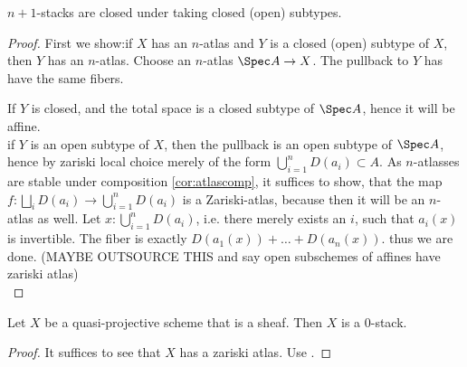 \begin{lemma}
	$n+1$-stacks are closed under taking closed (open) subtypes.
\end{lemma}
\begin{proof}
	First we show:if $X$ has an $n$-atlas and $Y$ is a closed (open) subtype of $X$, then $Y$ has an $n$-atlas. %
	Choose an $n$-atlas $\Spec A \to X$. The pullback to $Y$ has have the same fibers.
	
	If $Y$ is closed,  and the total space is a closed subtype of $\Spec A$, hence it will be affine. \\
	if $Y$ is an open subtype of $X$, then the pullback is an open subtype of $\Spec A$, hence by zariski local choice merely of the form $\bigcup_{i=1}^n D(a_i) \subset A$. 
	As $n$-atlasses are stable under composition \ref{cor:atlascomp}, it suffices to show, that the map $f : \bigsqcup_i D(a_i) \to \bigcup_{i=1}^n D(a_i)$ is a Zariski-atlas, because then it will be an $n$-atlas as well. Let $x : \bigcup_{i=1}^n D(a_i)$, i.e. there merely exists an $i$, such that $a_i(x)$ is invertible. The fiber is exactly $D(a_1(x)) + \hdots + D(a_n(x))$. thus we are done. (MAYBE OUTSOURCE THIS and say open subschemes of affines have zariski atlas)\\
\end{proof}
\begin{corollary}
	Let $X$ be a quasi-projective scheme that is a sheaf. Then $X$ is a  0-stack. 
\end{corollary}   
\begin{proof}
	It suffices to see that $X$ has a zariski atlas. Use \label{ex:PnIsStack}.
\end{proof}


